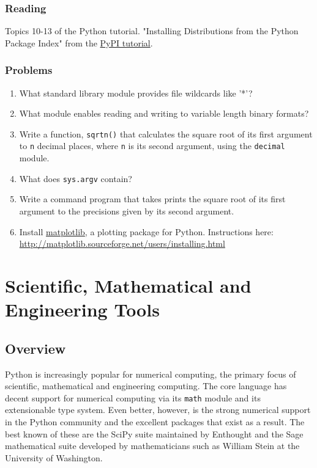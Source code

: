 \documentclass{report}
\begin{document}
\subsection{Reading}
Topics 10-13 of the Python tutorial. "Installing Distributions from the Python Package Index" from the \href{http://wiki.python.org/moin/CheeseShopTutorial}{PyPI tutorial}. 

\subsection{Problems}

\begin{enumerate}
	\item What standard library module provides file wildcards like '*'?
	\item What module enables reading and writing to variable length binary formats?
	\item Write a function, \verb|sqrtn()| that calculates the square root of its first argument to \verb|n| decimal places, where \verb|n| is its second argument, using the \verb|decimal| module.
	\item What does \verb|sys.argv| contain?
	\item Write a command program that takes prints the square root of its first argument to the precisions given by its second argument.
	\item Install \href{http://matplotlib.sourceforge.net/}{matplotlib}, a plotting package for Python. Instructions here: \url{http://matplotlib.sourceforge.net/users/installing.html}
\end{enumerate}

\chapter{Scientific, Mathematical and Engineering Tools}
\section{Overview}
Python is increasingly popular for numerical computing, the primary focus of scientific, mathematical and engineering computing. The core language has decent support for numerical computing via its \verb|math| module and its extensionable type system. Even better, however, is the strong numerical support in the Python community and the excellent packages that exist as a result. The best known of these are the SciPy suite maintained by Enthought and the Sage mathematical suite developed by mathematicians such as William Stein at the University of Washington.
\end{document}
